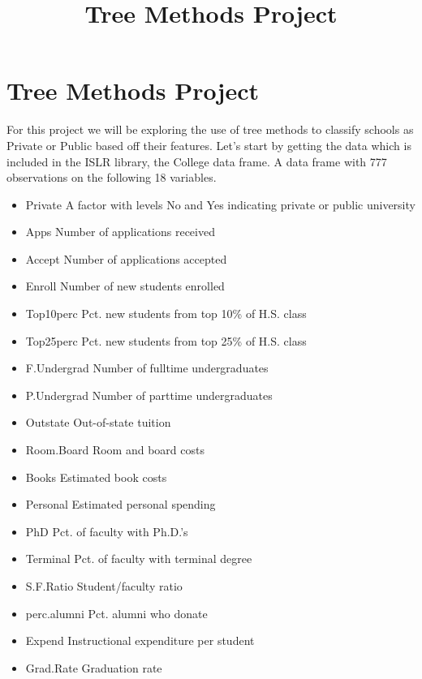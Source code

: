 \documentclass[]{article}
\title{Tree Methods Project}
\author{}
\date{\vspace{-2.5em}}
\providecommand{\tightlist}{%
  \setlength{\itemsep}{0pt}\setlength{\parskip}{0pt}}
\begin{document}
\maketitle

\hypertarget{tree-methods-project}{%
\section{Tree Methods Project}\label{tree-methods-project}}

For this project we will be exploring the use of tree methods to
classify schools as Private or Public based off their features. Let's
start by getting the data which is included in the ISLR library, the
College data frame. A data frame with 777 observations on the following
18 variables.

\begin{itemize}
\tightlist
\item
  Private A factor with levels No and Yes indicating private or public
  university
\item
  Apps Number of applications received
\item
  Accept Number of applications accepted
\item
  Enroll Number of new students enrolled
\item
  Top10perc Pct. new students from top 10\% of H.S. class
\item
  Top25perc Pct. new students from top 25\% of H.S. class
\item
  F.Undergrad Number of fulltime undergraduates
\item
  P.Undergrad Number of parttime undergraduates
\item
  Outstate Out-of-state tuition
\item
  Room.Board Room and board costs
\item
  Books Estimated book costs
\item
  Personal Estimated personal spending
\item
  PhD Pct. of faculty with Ph.D.'s
\item
  Terminal Pct. of faculty with terminal degree
\item
  S.F.Ratio Student/faculty ratio
\item
  perc.alumni Pct. alumni who donate
\item
  Expend Instructional expenditure per student
\item
  Grad.Rate Graduation rate
\end{itemize}
\end{document}
